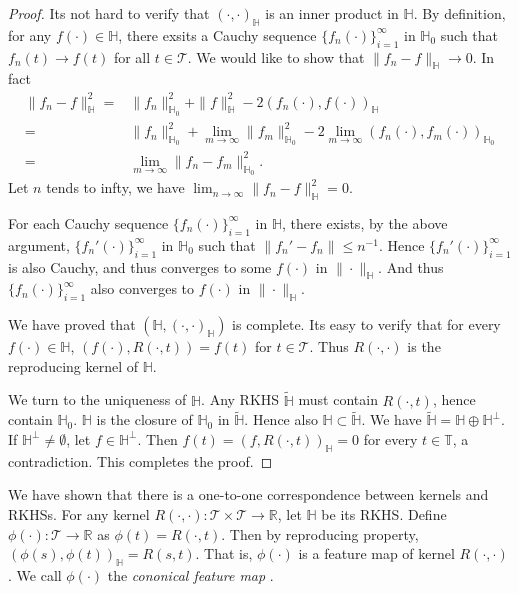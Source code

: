\documentclass[11pt]{article}
\theoremstyle{plain}
\theoremstyle{definition}
\theoremstyle{remark}
\begin{document}
\begin{proof}
Its not hard to verify that $(\cdot, \cdot)_{\mathbb H}$ is an inner product in $\mathbb H$.
By definition, for any $f(\cdot)\in \mathbb H$, there exsits a Cauchy sequence $\{f_n(\cdot)\}_{i=1}^\infty$ in $\mathbb H_0$ such that $f_n(t)\to f(t)$ for all $t\in\mathcal T$.
We would like to show that $\|f_n-f\|_{\mathbb H}\to 0$.
In fact
\begin{equation*}
    \begin{split}
    \|f_n-f\|^2_{\mathbb H}
    =&
    \|f_n\|^2_{\mathbb H_0}
    +
    \|f\|^2_{\mathbb H}
    -
    2(f_n(\cdot),f(\cdot))_{\mathbb H}
    \\
    =&
    \|f_n\|^2_{\mathbb H_0}
    +
    \lim_{m\to \infty}\|f_m\|^2_{\mathbb H_0}
    -
    2\lim_{m\to \infty}(f_n(\cdot),f_m(\cdot))_{\mathbb H_0}
    \\
    =&
    \lim_{m\to \infty}
    \|f_n-f_m\|^2_{\mathbb H_0}.
    \end{split}
\end{equation*}
Let $n$ tends to infty, we have
$
\lim_{n\to \infty}\|f_n-f\|^2_{\mathbb H}
=0
$.

For each Cauchy sequence $\{f_n(\cdot)\}_{i=1}^\infty$ in $\mathbb H$, there exists, by the above argument, $\{f_n'(\cdot)\}_{i=1}^\infty$ in $\mathbb H_0$ such that $\|f_n'-f_n\|\leq n^{-1}$.
Hence $\{f_n'(\cdot)\}_{i=1}^\infty$ is also Cauchy, and thus converges to some $f(\cdot)$ in $\|\cdot\|_{\mathbb H}$.
And thus $\{f_n(\cdot)\}_{i=1}^\infty$ also converges to $f(\cdot)$ in $\|\cdot\|_{\mathbb H}$.

We have proved that $(\mathbb H,(\cdot,\cdot)_{\mathbb H})$ is complete.
Its easy to verify that for every $f(\cdot) \in \mathbb H$, $(f(\cdot),R(\cdot, t))=f(t)$ for $t\in \mathcal T$.
Thus $R(\cdot,\cdot)$ is the reproducing kernel of $\mathbb H$.

We turn to the uniqueness of $\mathbb H$.
Any RKHS $\tilde{\mathbb H}$ must contain $R(\cdot, t)$, hence contain $\mathbb H_0$.
$\mathbb H$ is the closure of $\mathbb H_0$ in $\tilde{\mathbb H}$. Hence also
$\mathbb H\subset \tilde{\mathbb H}$.
We have $\tilde{\mathbb H}=\mathbb H \oplus \mathbb H^{\perp}$.
If $\mathbb H^{\perp}\neq \emptyset$, let $f\in \mathbb H^{\perp}$.
Then $f(t)=(f,R(\cdot,t))_{\mathbb H}=0$ for every $t\in \mathbb T$, a contradiction.
This completes the proof.
\end{proof}


We have shown that there is a one-to-one correspondence between kernels and RKHSs.
For any kernel $R(\cdot,\cdot):\mathcal T \times \mathcal T \to \mathbb R$, let $\mathbb H$ be its RKHS.
Define $\phi(\cdot):\mathcal T \to \mathbb R$ as $\phi(t)=R(\cdot,t)$. Then by reproducing property, $(\phi(s),\phi(t))_{\mathbb H}=R(s,t)$.
That is, $\phi(\cdot)$ is a feature map of kernel $R(\cdot,\cdot)$.
We call $\phi(\cdot)$ the \emph{cononical feature map} \cite{book:274797}.
\end{document}
